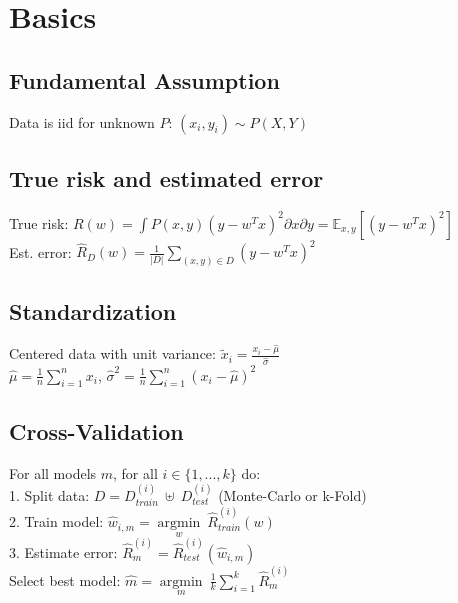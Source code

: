 \section*{Basics}

\subsection*{Fundamental Assumption}
Data is iid for unknown $P$: $(x_i, y_i) \sim P(X,Y)$

\subsection*{True risk and estimated error}
True risk: $R(w) = \int P(x,y) (y-w^Tx)^2 \partial x \partial y = \mathbb{E}_{x,y}[(y-w^Tx)^2]$ \\
Est. error: $\hat{R}_D(w) = \frac{1}{|D|}\sum_{(x,y)\in D} (y-w^Tx)^2$

\subsection*{Standardization}
Centered data with unit variance:
$\tilde{x}_{i} = \frac{x_{i}-\hat{\mu}}{\hat{\sigma}}$\\
$\hat{\mu} = \frac{1}{n}\sum_{i=1}^n x_{i}$, $\hat{\sigma}^2 = \frac{1}{n}\sum_{i=1}^n {(x_{i}-\hat{\mu})}^2$ 

\subsection*{Cross-Validation}
For all models $m$, for all $i \in \{ 1, ..., k \}$ do:\\
1. Split data: $D = D_{train}^{(i)} ~ \uplus ~ D_{test}^{(i)} $ (Monte-Carlo or k-Fold) \\
2. Train model: $\hat{w}_{i,m} = \underset{w}{\operatorname{argmin}} ~ \hat{R}_{train}^{(i)} (w)$ \\
3. Estimate error: $\hat{R}_{m}^{(i)} = \hat{R}_{test}^{(i)} (\hat{w}_{i,m})$ \\
Select best model: $\hat{m} = \underset{m}{\operatorname{argmin}} ~ \frac{1}{k} \sum_{i=1}^{k} \hat{R}_{m}^{(i)}$



